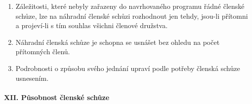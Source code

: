 \begin{enumerate}
    \item Záležitosti, které nebyly zařazeny do navrhovaného programu řádné členské schůze, lze na náhradní členské schůzi rozhodnout jen tehdy, jsou-li přítomni a projeví-li s tím souhlas všichni členové družstva.
    \item Náhradní členská schůze je schopna se usnášet bez ohledu na počet přítomných členů.
    \item Podrobnosti o způsobu svého jednání upraví podle potřeby členská schůze usnesením.
\end{enumerate}

\paragraph{XII. Působnost členské schůze}
